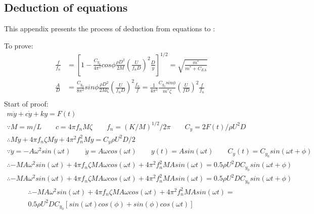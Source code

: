 \begin{appendices} %
\chapter{Deduction of equations} \label{ap:deducequ}
This appendix presents the process of deduction from equations  to :

\setlength{\belowdisplayskip}{0.3pt} \setlength{\belowdisplayshortskip}{0.3pt}
\setlength{\abovedisplayskip}{0.5pt} \setlength{\abovedisplayshortskip}{0.5pt}
To prove:
\begin{align*}
	\frac{f}{f_n}&=[1-\frac{C_{y_0}}{4\pi^2}cos\phi\frac{\rho D^2}{2M}(\frac{U}{f_nD})^2\frac{D}{y}]^{1/2}=\sqrt{\frac{m^*}{m^*+C_{EA}}}\\
	\frac{  A}{D} &=\frac{C_{y_0}}{8\pi^2}sin\phi \frac{\rho D^2}{2 M\zeta} (\frac{U}{f_n D})^2  \frac{  f_n  }{    { f} }=\frac{1}{4 \pi ^3}  \frac{ C_{y_0} sin \phi}{m^* \zeta} (\frac{U}{fD})^2 \frac{f}{f_{n}}\\
\end{align*}
Start of proof:
\begin{gather*}
	m\ddot{y}+c\dot{y}+ky=F(t)  \\
	\because M=m/L \qquad c=4\pi f_n M \zeta \qquad f_n=(K/M)^{1/2} / 2\pi \qquad C_y=2F(t)/ \rho U^2 D \\
	\therefore M\ddot{y}+4\pi f_n \zeta M \dot{y}+4{\pi}^2{f_n^2} M y=C_y \rho U^2 D /2\\
	\because   \ddot{y}=-A\omega^2 sin(\omega t) \qquad \dot{y}=A \omega cos(\omega t) \qquad y(t)=Asin(\omega t) \qquad C_y(t)=C_{y_0} sin(\omega t+\phi) \\
	\therefore -MA\omega^2 sin(\omega t)+4\pi f_n \zeta M A \omega cos(\omega t)+4{\pi}^2{f_n^2} M Asin(\omega t)= 0.5 \rho U^2 D C_{y_0} sin(\omega t+\phi)\\
	\therefore -MA\omega^2 sin(\omega t)+4\pi f_n \zeta M A \omega cos(\omega t)+4{\pi}^2{f_n^2} M Asin(\omega t)= 0.5 \rho U^2 D C_{y_0} sin(\omega t+\phi)
\end{gather*}
\begin{multline*}
	\therefore -MA\omega^2 sin(\omega t)+4\pi f_n \zeta M A \omega cos(\omega t)+4{\pi}^2{f_n^2} M Asin(\omega t)= \\0.5 \rho U^2 D C_{y_0} [sin(\omega t)cos(\phi)+sin(\phi)cos( \omega t)]
\end{multline*}
\begin{multline*}

\end{multline*}
\end{appendices}
